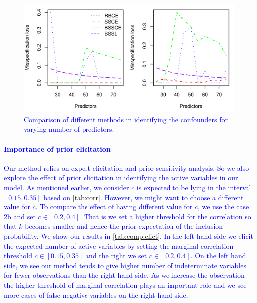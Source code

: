 \documentclass[preprint,12pt]{elsarticle}
\newcommand{\added}[1]{\textcolor{blue}{#1}}
\begin{document}
\begin{figure}
	\centering
	\includegraphics[width = 0.9\linewidth]{loss_pred.pdf}
	\caption{\added{Comparison of different methods in identifying the confounders for varying number of predictors.}}
	\label{fig:comp:loss:pred}
\end{figure}

\paragraph{\added{Importance of prior elicitation}}\label{sec:importance:elicit}
\added{Our method relies on expert elicitation and prior sensitivity analysis. So we also explore the effect of prior elicitation in identifying the active variables in our model. As mentioned earlier,
	we consider $c$ is expected to be lying in the interval $[0.15,0.35]$
	based on \cref{tab:corr}. However, we might want to choose a different
	value for $c$. To compare the effect of having different value for $c$, we use the case 2b and set $c\in[0.2,0.4]$. That is we set a higher threshold for the correlation so that $\overline{k}$ becomes smaller and hence the prior expectation of the inclusion probability. We show our results in \cref{tab:comp:elict}. In the left hand side we elicit the expected number of active variables by setting the marginal correlation threshold $c\in[0.15,0.35]$ and the right we set $c\in[0.2,0.4]$. On the left hand side, we see our method tends to give higher number of indeterminate variables for fewer observations than the right hand side. As we increase the observation the higher threshold of marginal correlation plays an important role and we see more cases of false negative variables on the right hand side. }
\end{document}

